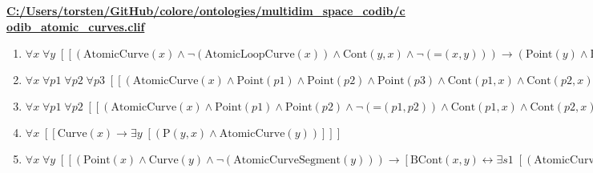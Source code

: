 \documentclass{article}
\begin{document}
\textbf{\url{C:/Users/torsten/GitHub/colore/ontologies/multidim\_space\_codib/codib\_atomic\_curves.clif}}

\begin{enumerate}
\item $\forall x\; \forall y\;  \left[ \left[ \left(\textrm{AtomicCurve}(x) \land \neg \left(\textrm{AtomicLoopCurve}(x)\right) \land \textrm{Cont}(y,x) \land \neg \left(\textrm{=}(x,y)\right)\right) \rightarrow \left(\textrm{Point}(y) \land \textrm{BCont}(y,x)\right) \right] \right]$
\item $\forall x\; \forall p1\; \forall p2\; \forall p3\;  \left[ \left[ \left(\textrm{AtomicCurve}(x) \land \textrm{Point}(p1) \land \textrm{Point}(p2) \land \textrm{Point}(p3) \land \textrm{Cont}(p1,x) \land \textrm{Cont}(p2,x) \land \textrm{Cont}(p3,x)\right) \rightarrow \left(\textrm{=}(p1,p2) \lor \textrm{=}(p1,p3) \lor \textrm{=}(p2,p3)\right) \right] \right]$
\item $\forall x\; \forall p1\; \forall p2\;  \left[ \left[ \left(\textrm{AtomicCurve}(x) \land \textrm{Point}(p1) \land \textrm{Point}(p2) \land \neg \left(\textrm{=}(p1,p2)\right) \land \textrm{Cont}(p1,x) \land \textrm{Cont}(p2,x)\right) \rightarrow \neg \left(\textrm{Closed}(x)\right) \right] \right]$
\item $\forall x\;  \left[ \left[ \textrm{Curve}(x) \rightarrow \exists y\;  \left[ \left(\textrm{P}(y,x) \land \textrm{AtomicCurve}(y)\right) \right] \right] \right]$
\item $\forall x\; \forall y\;  \left[ \left[ \left(\textrm{Point}(x) \land \textrm{Curve}(y) \land \neg \left(\textrm{AtomicCurveSegment}(y)\right)\right) \rightarrow \left[ \textrm{BCont}(x,y) \leftrightarrow \exists s1\;  \left[ \left(\textrm{AtomicCurve}(s1) \land \textrm{P}(s1,y) \land \textrm{BCont}(x,s1) \land \forall s2\;  \left[ \left[ \left(\textrm{P}(s2,y) \land \textrm{AtomicCurve}(s2) \land \textrm{BCont}(x,s2)\right) \rightarrow \textrm{=}(s1,s2) \right] \right]\right) \right] \right] \right] \right]$
\end{enumerate}
\end{document}
